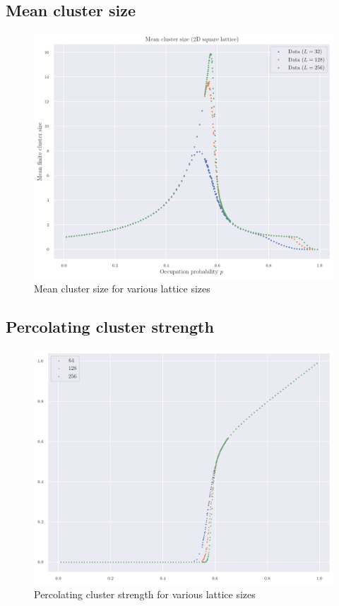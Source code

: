 \subsection{Mean cluster size}

\begin{figure}[H]
  \includegraphics[width=\linewidth]{Images/chap1_mean_cluster_size_1.png}
  \caption{Mean cluster size for various lattice sizes}
  \label{fig:chap1_mean_cluster_size_1}
\end{figure}

\subsection{Percolating cluster strength}


\begin{figure}[H]
  \includegraphics[width=\linewidth]{Images/chap1_perc_clust_strength_1.png}
  \caption{Percolating cluster strength for various lattice sizes}
  \label{fig:chap1_perc_clust_strength_1}
\end{figure}














